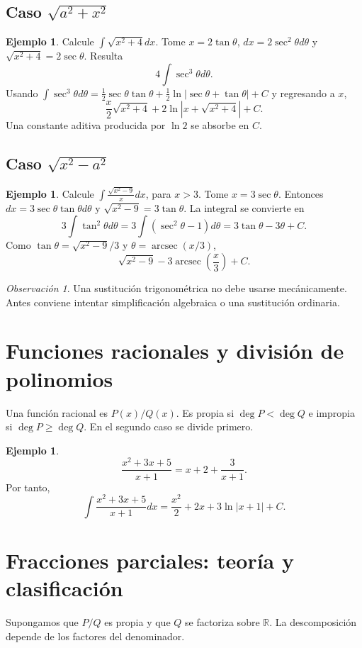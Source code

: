 \documentclass[12pt]{article}
\theoremstyle{definition}\newtheorem{definicion}[teorema]{Definición}\newtheorem{ejemplo}[teorema]{Ejemplo}\newtheorem{ejercicio}[teorema]{Ejercicio}
\theoremstyle{remark}\newtheorem*{observacion}{Observación}\newtheorem*{advertencia}{Advertencia}\newtheorem*{estrategia}{Estrategia}
\newcommand{\R}{\mathbb{R}}\newcommand{\dd}{\,dx}\newcommand{\du}{\,du}\newcommand{\dt}{\,dt}
\begin{document}
\subsection{Caso $\sqrt{a^2+x^2}$}
\begin{ejemplo}Calcule $\int\sqrt{x^2+4}dx$. Tome $x=2\tan\theta$, $dx=2\sec^2\theta d\theta$ y $\sqrt{x^2+4}=2\sec\theta$. Resulta
\[4\int\sec^3\theta d\theta.\]
Usando $\int\sec^3\theta d\theta=\frac12\sec\theta\tan\theta+\frac12\ln|\sec\theta+\tan\theta|+C$ y regresando a $x$,
\[\boxed{\frac{x}{2}\sqrt{x^2+4}+2\ln|x+\sqrt{x^2+4}|+C}.\]
Una constante aditiva producida por $\ln2$ se absorbe en $C$.\end{ejemplo}
\subsection{Caso $\sqrt{x^2-a^2}$}
\begin{ejemplo}Calcule $\int\frac{\sqrt{x^2-9}}{x}dx$, para $x>3$. Tome $x=3\sec\theta$. Entonces $dx=3\sec\theta\tan\theta d\theta$ y $\sqrt{x^2-9}=3\tan\theta$. La integral se convierte en
\[3\int\tan^2\theta d\theta=3\int(\sec^2\theta-1)d\theta=3\tan\theta-3\theta+C.\]
Como $\tan\theta=\sqrt{x^2-9}/3$ y $\theta=\operatorname{arcsec}(x/3)$,
\[\boxed{\sqrt{x^2-9}-3\operatorname{arcsec}\left(\frac{x}{3}\right)+C}.\]\end{ejemplo}
\begin{observacion}Una sustitución trigonométrica no debe usarse mecánicamente. Antes conviene intentar simplificación algebraica o una sustitución ordinaria.\end{observacion}

\section{Funciones racionales y división de polinomios}
Una función racional es $P(x)/Q(x)$. Es propia si $\deg P<\deg Q$ e impropia si $\deg P\ge\deg Q$. En el segundo caso se divide primero.
\begin{ejemplo}
\[\frac{x^2+3x+5}{x+1}=x+2+\frac3{x+1}.\]
Por tanto,
\[\boxed{\int\frac{x^2+3x+5}{x+1}dx=\frac{x^2}{2}+2x+3\ln|x+1|+C}.\]
\end{ejemplo}

\section{Fracciones parciales: teoría y clasificación}
Supongamos que $P/Q$ es propia y que $Q$ se factoriza sobre $\R$. La descomposición depende de los factores del denominador.
\end{document}
